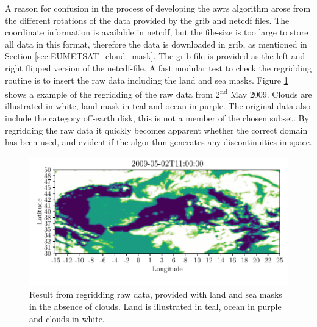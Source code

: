 A reason for confusion in the process of developing the \acrshort{awrs} algorithm arose from the different rotations of the data provided by the \acrshort{grib} and \acrshort{netcdf} files. The coordinate information is available in \acrshort{netcdf}, but the file-size is too large to store all data in this format, therefore the data is downloaded in \acrshort{grib}, as mentioned in Section \ref{sec:EUMETSAT_cloud_mask}. The \acrshort{grib}-file is provided as the left and right flipped version of the  \acrshort{netcdf}-file. A fast modular test to check the regridding routine is to insert the raw data including the land and sea masks. Figure \ref{fig:visual_inspection_regridding} shows a example of the regridding of the raw data from 2\textsuperscript{nd} May 2009. Clouds are illustrated in white, land mask in teal and ocean in purple. The original data also include the category off-earth disk, this is not a member of the chosen subset. By regridding the raw data it quickly becomes apparent whether the correct domain has been used, and evident if the algorithm generates any discontinuities in space. 
\begin{figure}
    \centering
    \includegraphics{python_figs/visual_regridding.pdf}
    \caption{Result from regridding raw data, provided with land and sea masks in the absence of clouds. Land is illustrated in teal, ocean in purple and clouds in white.}
    \label{fig:visual_inspection_regridding}
\end{figure}


